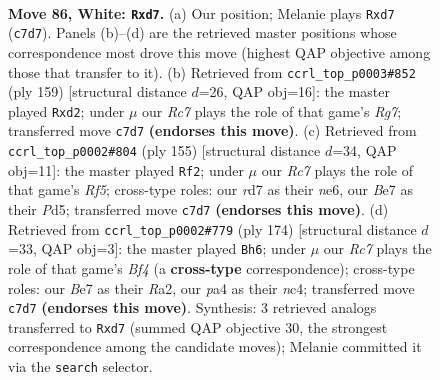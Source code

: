 \documentclass[11pt]{article}
\begin{document}
\clearpage

\begin{figure}[p]\centering
\begin{subfigure}{0.46\textwidth}\centering
\resizebox{\linewidth}{!}{%
\newchessgame
\chessboard[
  setfen={7k/2RrB3/1n6/8/p4P2/P6P/6K1/8 w - - 27 86},
  showmover=false,
  pgfstyle=straightmove, color=movearrow, markmove={c7-d7}
]}
\caption{}
\end{subfigure}\hfill
\begin{subfigure}{0.46\textwidth}\centering
\resizebox{\linewidth}{!}{%
\newchessgame
\chessboard[
  setfen={8/4k3/K4p2/5p2/2N5/8/3R2r1/8 b - - 2 80},
  showmover=false,
  pgfstyle=straightmove, color=movearrow, markmove={g2-d2}
]}
\caption{}
\end{subfigure}
\\[4pt]
\begin{subfigure}{0.46\textwidth}\centering
\resizebox{\linewidth}{!}{%
\newchessgame
\chessboard[
  setfen={4k3/8/4N1K1/3p4/3P1r2/2n5/8/R7 b - - 2 78},
  showmover=false,
  pgfstyle=straightmove, color=movearrow, markmove={f4-f2}
]}
\caption{}
\end{subfigure}\hfill
\begin{subfigure}{0.46\textwidth}\centering
\resizebox{\linewidth}{!}{%
\newchessgame
\chessboard[
  setfen={8/5r1p/6p1/8/2n2B2/7P/R5P1/3k2K1 w - - 48 88},
  showmover=false,
  pgfstyle=straightmove, color=movearrow, markmove={f4-h6}
]}
\caption{}
\end{subfigure}
\caption{\textbf{Move 86, White: \texttt{Rxd7}.} (a) Our position; Melanie plays \texttt{Rxd7} (\texttt{c7d7}). Panels (b)--(d) are the retrieved master positions whose correspondence most drove this move (highest QAP objective among those that transfer to it). (b) Retrieved from \texttt{ccrl\_top\_p0003\#852} (ply 159) [structural distance $d$=26, QAP obj=16]: the master played \texttt{Rxd2}; under $\mu$ our \emph{Rc7} plays the role of that game's \emph{Rg7}; transferred move \texttt{c7d7} \textbf{(endorses this move)}. (c) Retrieved from \texttt{ccrl\_top\_p0002\#804} (ply 155) [structural distance $d$=34, QAP obj=11]: the master played \texttt{Rf2}; under $\mu$ our \emph{Rc7} plays the role of that game's \emph{Rf5}; cross-type roles: our \emph{r}d7 as their \emph{n}e6, our \emph{B}e7 as their \emph{P}d5; transferred move \texttt{c7d7} \textbf{(endorses this move)}. (d) Retrieved from \texttt{ccrl\_top\_p0002\#779} (ply 174) [structural distance $d$=33, QAP obj=3]: the master played \texttt{Bh6}; under $\mu$ our \emph{Rc7} plays the role of that game's \emph{Bf4} (a \textbf{cross-type} correspondence); cross-type roles: our \emph{B}e7 as their \emph{R}a2, our \emph{p}a4 as their \emph{n}c4; transferred move \texttt{c7d7} \textbf{(endorses this move)}. Synthesis: 3 retrieved analogs transferred to \texttt{Rxd7} (summed QAP objective 30, the strongest correspondence among the candidate moves); Melanie committed it via the \texttt{search} selector.}
\label{fig:thought-m170}
\end{figure}
\end{document}
